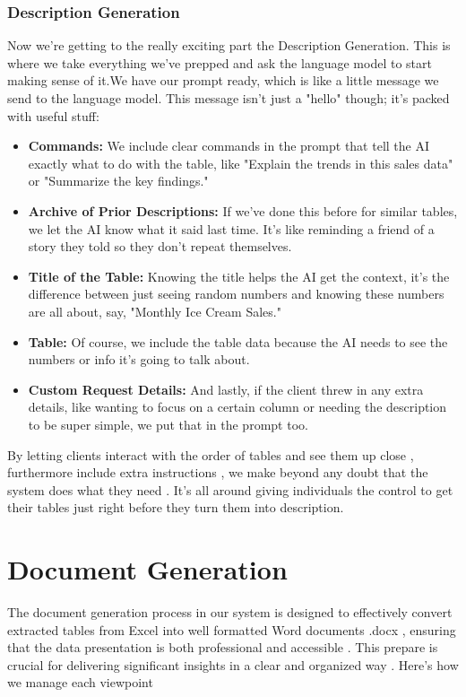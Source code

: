 \subsubsection{Description Generation}
Now we're getting to the really exciting part the Description Generation. This is where we take everything we've prepped and ask the language model to start making sense of it.We have our prompt ready, which is like a little message we send to the language model. This message isn't just a "hello" though; it's packed with useful stuff:
\begin{itemize}
    \item \textbf{Commands:} We include clear commands in the prompt that tell the AI exactly what to do with the table, like "Explain the trends in this sales data" or "Summarize the key findings."
    
    \item \textbf{Archive of Prior Descriptions:} If we've done this before for similar tables, we let the AI know what it said last time. It's like reminding a friend of a story they told so they don't repeat themselves.
     
    \item \textbf{Title of the Table:} Knowing the title helps the AI get the context, it's the difference between just seeing random numbers and knowing these numbers are all about, say, "Monthly Ice Cream Sales."
    
    \item \textbf{Table:} Of course, we include the table data because the AI needs to see the numbers or info it's going to talk about.
    
    \item \textbf{Custom Request Details:} And lastly, if the client threw in any extra details, like wanting to focus on a certain column or needing the description to be super simple, we put that in the prompt too.
\end{itemize}

By letting clients interact with the order of tables and see them up close , furthermore include extra instructions , we make beyond any doubt that the system does what they need . It's all around giving individuals the control to get their tables just right before they turn them into description.

\section{Document Generation}
The document generation process in our system is designed to effectively convert extracted tables from Excel into well formatted Word documents .docx , ensuring that the data presentation is both professional and accessible . This prepare is crucial for delivering significant insights in a clear and organized way . Here's how we manage each viewpoint
